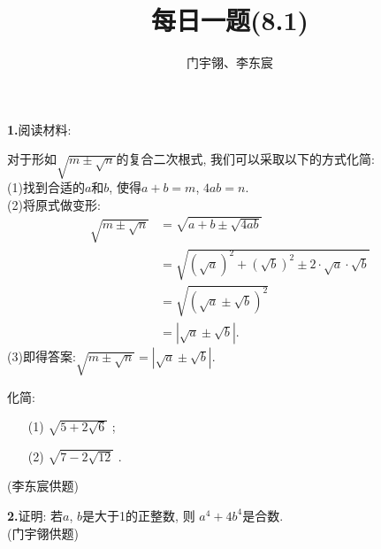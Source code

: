 \documentclass{article}
\title{每日一题(8.1)}
\author{门宇翎、李东宸}
\begin{document}
\maketitle
\textbf{1.}阅读材料:
{\kaishu
	\par 对于形如$\sqrt{m\pm\sqrt{n}}$的复合二次根式, 我们可以采取以下的方式化简: \\
	(1)\quad 找到合适的$a$和$b$, 使得$a+b=m$, $4ab=n$.\\
	(2)\quad 将原式做变形:
	\begin{align*}
		\sqrt{m\pm\sqrt{n}}&=\sqrt{a+b\pm\sqrt{4ab}}\\
		&=\sqrt{\left(\sqrt{a}\right)^2+\left(\sqrt{b}\right)^2\pm2\cdot\sqrt{a}\cdot\sqrt{b}}\\
		&=\sqrt{\left(\sqrt{a}\pm\sqrt{b}\right)^2}\\
		&=\left|\sqrt{a}\pm\sqrt{b}\right|.
	\end{align*}
	(3)\quad 即得答案:$\sqrt{m\pm\sqrt{n}}=\left|\sqrt{a}\pm\sqrt{b}\right|$.
}
\par 化简: 
\begin{itemize}
	\item[(1)]$\sqrt{5+2\sqrt{6}}$ ; 
	\item[(2)]$\sqrt{7-2\sqrt{12}}$ . 
\end{itemize}
{\kaishu (李东宸供题)}\\
\par \textbf{2.}证明: 若$a$, $b$是大于1的正整数, 则 $a^4+4b^4$是合数.\\
{\kaishu (门宇翎供题)} 
\end{document}
